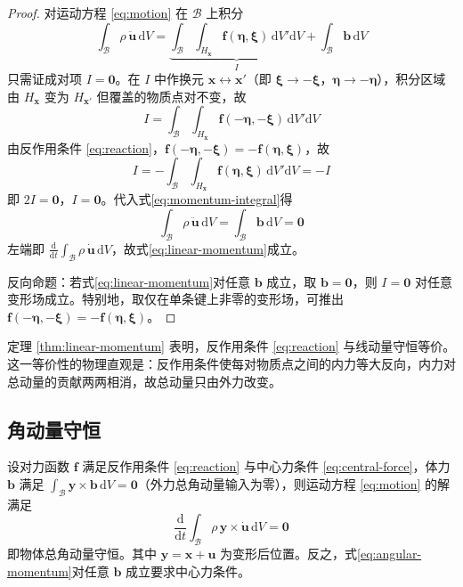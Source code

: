 \begin{proof}
  对运动方程 \eqref{eq:motion} 在 $\mathcal{B}$ 上积分
  \begin{equation}
    \int_{\mathcal{B}}\rho\,\ddot{\mathbf{u}}\,\mathrm{d}V=\underbrace{\int_{\mathcal{B}}\int_{H_{\mathbf{x}}}\mathbf{f}(\boldsymbol{\eta},\boldsymbol{\xi})\,\mathrm{d}V'\mathrm{d}V}_{\displaystyle I}+\int_{\mathcal{B}}\mathbf{b}\,\mathrm{d}V
    \label{eq:momentum-integral}
  \end{equation}
  只需证成对项 $I=\mathbf{0}$。在 $I$ 中作换元 $\mathbf{x}\leftrightarrow\mathbf{x}'$（即 $\boldsymbol{\xi}\to-\boldsymbol{\xi}$，$\boldsymbol{\eta}\to-\boldsymbol{\eta}$），积分区域由 $H_{\mathbf{x}}$ 变为 $H_{\mathbf{x}'}$ 但覆盖的物质点对不变，故
  \[
    I=\int_{\mathcal{B}}\int_{H_{\mathbf{x}}}\mathbf{f}(-\boldsymbol{\eta},-\boldsymbol{\xi})\,\mathrm{d}V'\mathrm{d}V
  \]
  由反作用条件 \eqref{eq:reaction}，$\mathbf{f}(-\boldsymbol{\eta},-\boldsymbol{\xi})=-\mathbf{f}(\boldsymbol{\eta},\boldsymbol{\xi})$，故
  \[
    I=-\int_{\mathcal{B}}\int_{H_{\mathbf{x}}}\mathbf{f}(\boldsymbol{\eta},\boldsymbol{\xi})\,\mathrm{d}V'\mathrm{d}V=-I
  \]
  即 $2I=\mathbf{0}$，$I=\mathbf{0}$。代入式\eqref{eq:momentum-integral}得
  \[
    \int_{\mathcal{B}}\rho\,\ddot{\mathbf{u}}\,\mathrm{d}V=\int_{\mathcal{B}}\mathbf{b}\,\mathrm{d}V=\mathbf{0}
  \]
  左端即 $\frac{\mathrm{d}}{\mathrm{d}t}\int_{\mathcal{B}}\rho\,\dot{\mathbf{u}}\,\mathrm{d}V$，故式\eqref{eq:linear-momentum}成立。

  反向命题：若式\eqref{eq:linear-momentum}对任意 $\mathbf{b}$ 成立，取 $\mathbf{b}=\mathbf{0}$，则 $I=\mathbf{0}$ 对任意变形场成立。特别地，取仅在单条键上非零的变形场，可推出 $\mathbf{f}(-\boldsymbol{\eta},-\boldsymbol{\xi})=-\mathbf{f}(\boldsymbol{\eta},\boldsymbol{\xi})$。
\end{proof}

定理 \ref{thm:linear-momentum} 表明，反作用条件 \eqref{eq:reaction} 与线动量守恒等价。这一等价性的物理直观是：反作用条件使每对物质点之间的内力等大反向，内力对总动量的贡献两两相消，故总动量只由外力改变。

\subsection{角动量守恒}

\begin{theorem}[角动量守恒]
  设对力函数 $\mathbf{f}$ 满足反作用条件 \eqref{eq:reaction} 与中心力条件 \eqref{eq:central-force}，体力 $\mathbf{b}$ 满足 $\int_{\mathcal{B}}\mathbf{y}\times\mathbf{b}\,\mathrm{d}V=\mathbf{0}$（外力总角动量输入为零），则运动方程 \eqref{eq:motion} 的解满足
  \begin{equation}
    \frac{\mathrm{d}}{\mathrm{d}t}\int_{\mathcal{B}}\rho\,\mathbf{y}\times\dot{\mathbf{u}}\,\mathrm{d}V=\mathbf{0}
    \label{eq:angular-momentum}
  \end{equation}
  即物体总角动量守恒。其中 $\mathbf{y}=\mathbf{x}+\mathbf{u}$ 为变形后位置。反之，式\eqref{eq:angular-momentum}对任意 $\mathbf{b}$ 成立要求中心力条件。
  \label{thm:angular-momentum}
\end{theorem}

